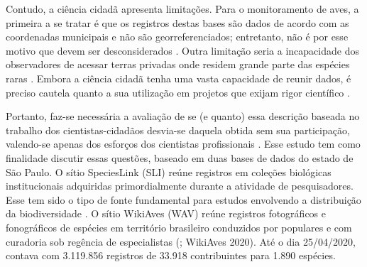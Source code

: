 Contudo, a ciência cidadã apresenta limitações. Para o monitoramento de aves, a primeira a se tratar é que os registros destas bases são dados de acordo com as coordenadas municipais e não são georreferenciados; entretanto, não é por esse motivo que devem ser desconsiderados \cite{Neto2017}. Outra limitação seria a incapacidade dos observadores de acessar terras privadas onde residem grande parte das espécies raras \cite{Lepczyk2005}. Embora a ciência cidadã tenha uma vasta capacidade de reunir dados, é preciso cautela quanto a sua utilização em projetos que exijam rigor científico \cite{Kieslinger2019}.

Portanto, faz-se necessária a avaliação de se (e quanto) essa descrição baseada no trabalho dos cientistas-cidadãos desvia-se daquela obtida sem sua participação, valendo-se apenas dos esforços dos cientistas profissionais \cite{Klemann-Junior2017}. Esse estudo tem como finalidade discutir essas questões, baseado em duas bases de dados do estado de São Paulo. O sítio SpeciesLink (SLI) reúne registros em coleções biológicas institucionais adquiridas primordialmente durante a atividade de pesquisadores. Esse tem sido o tipo de fonte fundamental para estudos envolvendo a distribuição da biodiversidade \cite{Horns2018}. O sítio WikiAves (WAV) reúne registros fotográficos e fonográficos de espécies em território brasileiro conduzidos por populares e com curadoria sob regência de especialistas (\cite{Cunha2014}; WikiAves 2020). Até o dia 25/04/2020, contava com 3.119.856 registros de 33.918 contribuintes para 1.890 espécies.
